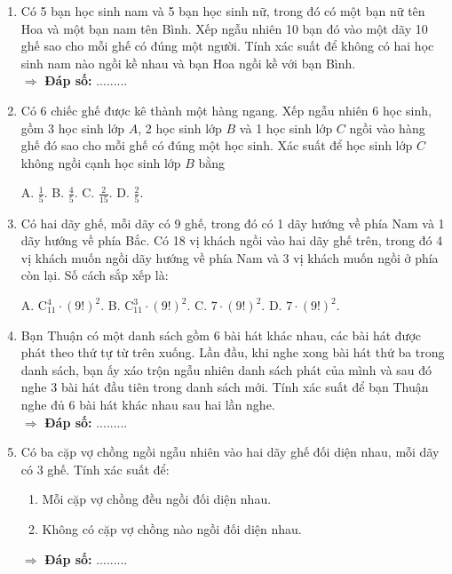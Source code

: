 \documentclass[12pt, a4paper]{article}
\newcommand{\C}[2]{\mathrm{C}_{#1}^{#2}}
\begin{document}
		\begin{enumerate}[label=\textbf{\arabic*.}, start=6]
			\item Có 5 bạn học sinh nam và 5 bạn học sinh nữ, trong đó có một bạn nữ tên Hoa và một bạn nam tên Bình. Xếp ngẫu nhiên 10 bạn đó vào một dãy 10 ghế sao cho mỗi ghế có đúng một người. Tính xác suất để không có hai học sinh nam nào ngồi kề nhau và bạn Hoa ngồi kề với bạn Bình. \\
			\(\Rightarrow\) \textbf{Đáp số:} .........
			
			\item Có 6 chiếc ghế được kê thành một hàng ngang. Xếp ngẫu nhiên 6 học sinh, gồm 3 học sinh lớp \(A\), 2 học sinh lớp \(B\) và 1 học sinh lớp \(C\) ngồi vào hàng ghế đó sao cho mỗi ghế có đúng một học sinh. Xác suất để học sinh lớp \(C\) không ngồi cạnh học sinh lớp \(B\) bằng
		
				A. \(\frac{1}{5}\). \hspace{3cm} B. \(\frac{4}{5}\). \hspace{3cm} C. \(\frac{2}{15}\). \hspace{3cm} D. \(\frac{2}{5}\).
			
			
			\item Có hai dãy ghế, mỗi dãy có 9 ghế, trong đó có 1 dãy hướng về phía Nam và 1 dãy hướng về phía Bắc. Có 18 vị khách ngồi vào hai dãy ghế trên, trong đó 4 vị khách muốn ngồi dãy hướng về phía Nam và 3 vị khách muốn ngồi ở phía còn lại. Số cách sắp xếp là:
			
				A. \(\C{11}{4} \cdot (9!)^2\). \hspace{2.5cm} B. \(\C{11}{3} \cdot (9!)^2\). \hspace{2.5cm} C. \(7 \cdot (9!)^2\). \hspace{2.5cm} D. \(7 \cdot (9!)^2\).
		

			
			\item Bạn Thuận có một danh sách gồm 6 bài hát khác nhau, các bài hát được phát theo thứ tự từ trên xuống. Lần đầu, khi nghe xong bài hát thứ ba trong danh sách, bạn ấy xáo trộn ngẫu nhiên danh sách phát của mình và sau đó nghe 3 bài hát đầu tiên trong danh sách mới. Tính xác suất để bạn Thuận nghe đủ 6 bài hát khác nhau sau hai lần nghe. \\
			\(\Rightarrow\) \textbf{Đáp số:} .........
			
			\item Có ba cặp vợ chồng ngồi ngẫu nhiên vào hai dãy ghế đối diện nhau, mỗi dãy có 3 ghế. Tính xác suất để:
			\begin{enumerate}[label=\alph*)]
				\item Mỗi cặp vợ chồng đều ngồi đối diện nhau.
				\item Không có cặp vợ chồng nào ngồi đối diện nhau.
			\end{enumerate}
			\(\Rightarrow\) \textbf{Đáp số:} .........
		\end{enumerate}
			\newpage
\end{document}
